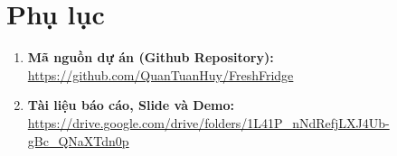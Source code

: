 \section*{Phụ lục}

\begin{enumerate}
    \item \textbf{Mã nguồn dự án (Github Repository):} \\
    \url{https://github.com/QuanTuanHuy/FreshFridge}

    \item \textbf{Tài liệu báo cáo, Slide và Demo:} \\
    \url{https://drive.google.com/drive/folders/1L41P_nNdRefjLXJ4Ub-gBc_QNaXTdn0p}
\end{enumerate}
